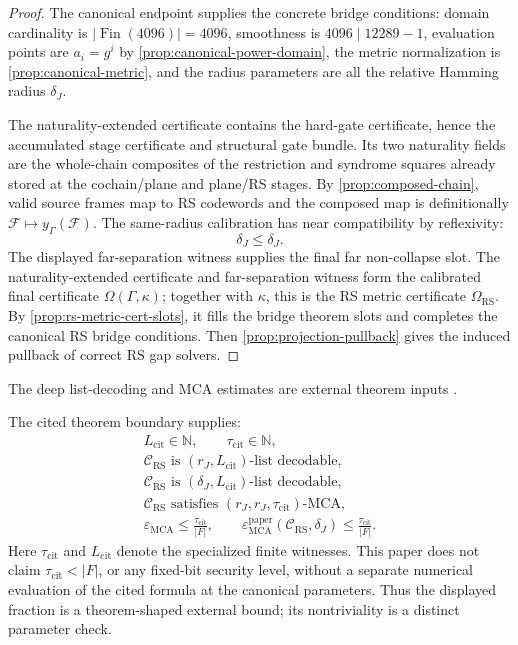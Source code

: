 \begin{proof}
The canonical endpoint supplies the concrete bridge conditions:
domain cardinality is \(|\operatorname{Fin}(4096)|=4096\), smoothness is
\(4096\mid12289-1\), evaluation points are \(a_i=g^i\) by
\cref{prop:canonical-power-domain}, the metric normalization is
\cref{prop:canonical-metric}, and the radius parameters are all the relative
Hamming radius \(\delta_J\).

The naturality-extended certificate contains the hard-gate certificate, hence
the accumulated stage certificate and structural gate bundle. Its two
naturality fields are the whole-chain composites of the restriction and
syndrome squares already stored at the cochain/plane and plane/RS stages. By
\cref{prop:composed-chain}, valid source frames
map to RS codewords and the composed map is definitionally
\(\mathcal F\mapsto y_\Gamma(\mathcal F)\). The same-radius calibration has
near compatibility by reflexivity:
\[
  \delta_J\le\delta_J.
\]
The displayed far-separation witness supplies the final far non-collapse slot.
The naturality-extended certificate and far-separation witness form the
calibrated final certificate \(\Omega(\Gamma,\kappa)\); together with
\(\kappa\), this is the RS metric certificate \(\Omega_{\mathrm{RS}}\). By
\cref{prop:rs-metric-cert-slots}, it fills the bridge theorem slots and
completes the canonical RS bridge conditions. Then
\cref{prop:projection-pullback} gives the induced pullback of correct RS gap
solvers.
\end{proof}

The deep list-decoding and MCA estimates are external theorem inputs
\cite{benSassonCarmonHabockKoppartySaraf2026,proximityPrize2026}.

\begin{assumption}
The cited theorem boundary supplies:
\[
\begin{gathered}
  L_{\mathrm{cit}}\in\mathbb N,\qquad
  \tau_{\mathrm{cit}}\in\mathbb N,\\
  \mathcal C_{\mathrm{RS}}\text{ is }(r_J,L_{\mathrm{cit}})\text{-list decodable},\\
  \mathcal C_{\mathrm{RS}}\text{ is }(\delta_J,L_{\mathrm{cit}})\text{-list decodable},\\
  \mathcal C_{\mathrm{RS}}\text{ satisfies }(r_J,r_J,\tau_{\mathrm{cit}})\text{-MCA},\\
  \varepsilon_{\mathrm{MCA}}\le
  \frac{\tau_{\mathrm{cit}}}{|F|},
  \qquad
  \varepsilon_{\mathrm{MCA}}^{\mathrm{paper}}(\mathcal C_{\mathrm{RS}},\delta_J)
  \le
  \frac{\tau_{\mathrm{cit}}}{|F|}.
\end{gathered}
\]
Here \(\tau_{\mathrm{cit}}\) and \(L_{\mathrm{cit}}\) denote the specialized
finite witnesses. This paper does not claim
\(\tau_{\mathrm{cit}}<|F|\), or any fixed-bit security level, without a
separate numerical evaluation of the cited formula at the canonical
parameters. Thus the displayed fraction is a theorem-shaped external bound;
its nontriviality is a distinct parameter check.
\end{assumption}

